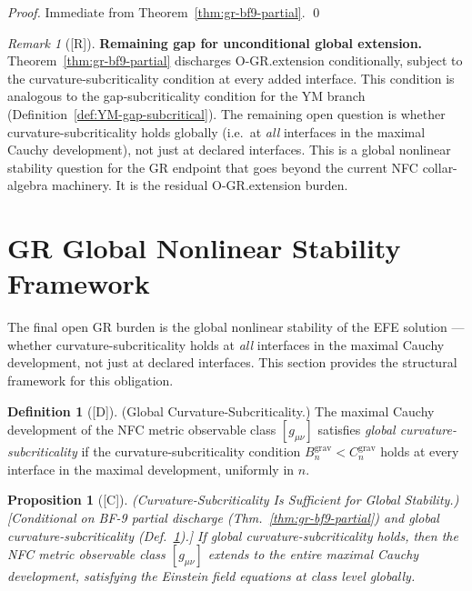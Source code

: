 \documentclass[12pt,oneside]{amsbook}
\theoremstyle{plain}
\newtheorem{proposition}[theorem]{Proposition}
\theoremstyle{definition}
\newtheorem{definition}[theorem]{Definition}
\theoremstyle{remark}
\newtheorem{remark}[theorem]{Remark}
\newcommand{\status}[1]{\textup{[#1]}}
\begin{document}
\begin{proof}
Immediate from Theorem~\ref{thm:gr-bf9-partial}. \qed
\end{proof}

\begin{remark}[\status{R}]
\textbf{Remaining gap for unconditional global extension.}
Theorem~\ref{thm:gr-bf9-partial} discharges O-GR.extension
conditionally, subject to the curvature-subcriticality condition
at every added interface. This condition is analogous to the
gap-subcriticality condition for the YM branch
(Definition~\ref{def:YM-gap-subcritical}). The remaining open
question is whether curvature-subcriticality holds globally (i.e.\
at \emph{all} interfaces in the maximal Cauchy development),
not just at declared interfaces. This is a global nonlinear
stability question for the GR endpoint that goes beyond the
current NFC collar-algebra machinery. It is the residual
O-GR.extension burden.
\end{remark}

\section{GR Global Nonlinear Stability Framework}
\label{sec:gr-global-stability}

The final open GR burden is the global nonlinear stability of
the EFE solution --- whether curvature-subcriticality holds at
\emph{all} interfaces in the maximal Cauchy development, not
just at declared interfaces. This section provides the
structural framework for this obligation.

\begin{definition}[\status{D}]\label{def:curv-subcrit-global}
\textup{(Global Curvature-Subcriticality.)}
The maximal Cauchy development of the NFC metric observable class
$[g_{\mu\nu}]$ satisfies \emph{global curvature-subcriticality}
if the curvature-subcriticality condition
$B_n^{\mathrm{grav}} < C_n^{\mathrm{grav}}$ holds at every
interface in the maximal development, uniformly in $n$.
\end{definition}

\begin{proposition}[\status{C}]\label{prop:gr-subcrit-sufficient}
\textup{(Curvature-Subcriticality Is Sufficient for Global Stability.)}
\textup{[Conditional on BF-9 partial discharge
(Thm.~\ref{thm:gr-bf9-partial}) and global curvature-subcriticality
(Def.~\ref{def:curv-subcrit-global}).]}
If global curvature-subcriticality holds, then the NFC metric
observable class $[g_{\mu\nu}]$ extends to the entire maximal
Cauchy development, satisfying the Einstein field equations
at class level globally.
\end{proposition}
\end{document}
